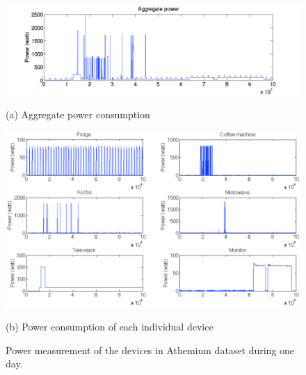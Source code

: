 \begin{figure}
\begin{minipage}[b]{1.0\linewidth}
  \centering
  \centerline{\includegraphics[width=1\textwidth]{./chapters/chapter3/images/A_aggpow.pdf}}
  \centerline{(a) Aggregate power consumption}\medskip
\end{minipage}
\begin{minipage}[b]{1.0\linewidth}
  \centering
  \centerline{\includegraphics[width=1\textwidth]{./chapters/chapter3/images/A_pow.pdf}}
  \centerline{(b) Power consumption of each individual device}\medskip
\end{minipage}
\caption{Power measurement of the devices in Athemium dataset during one day.}
\label{fig:L3} 
\end{figure}




